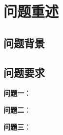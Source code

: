 \section{问题重述}

\subsection{问题背景}



\subsection{问题要求}



\textbf{问题一}：

\textbf{问题二}：

\textbf{问题三}：
